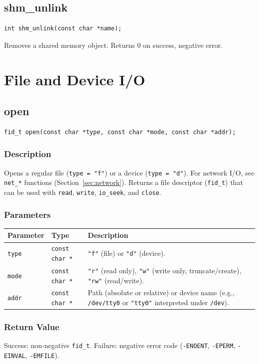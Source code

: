 \documentclass[12pt,a4paper]{article}
\begin{document}
\subsection{shm\_unlink}
\begin{lstlisting}
int shm_unlink(const char *name);
\end{lstlisting}
Removes a shared memory object. Returns 0 on success, negative error.
\section{File and Device I/O}

\subsection{open}
\begin{lstlisting}
fid_t open(const char *type, const char *mode, const char *addr);
\end{lstlisting}

\subsubsection{Description}
Opens a regular file (\texttt{type = "f"}) or a device (\texttt{type = "d"}). For network I/O, see \texttt{net\_*} functions (Section~\ref{sec:network}). Returns a file descriptor (\texttt{fid\_t}) that can be used with \texttt{read}, \texttt{write}, \texttt{io\_seek}, and \texttt{close}.

\subsubsection{Parameters}
\begin{tabularx}{\textwidth}{|l|l|X|}
\hline
\textbf{Parameter} & \textbf{Type} & \textbf{Description} \\
\hline
\verb|type| & \verb|const char *| & \texttt{"f"} (file) or \texttt{"d"} (device). \\
\verb|mode| & \verb|const char *| & \texttt{"r"} (read only), \texttt{"w"} (write only, truncate/create), \texttt{"rw"} (read/write). \\
\verb|addr| & \verb|const char *| & Path (absolute or relative) or device name (e.g., \texttt{/dev/tty0} or \texttt{"tty0"} interpreted under \texttt{/dev}). \\
\hline
\end{tabularx}

\subsubsection{Return Value}
Success: non-negative \texttt{fid\_t}. Failure: negative error code (\texttt{-ENOENT}, \texttt{-EPERM}, \texttt{-EINVAL}, \texttt{-EMFILE}).
\end{document}

